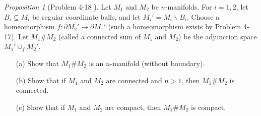 \documentclass[a4paper]{article}
\theoremstyle{remark}
\newtheorem{prop}{Proposition}
\newcommand{\doo}{\partial}    %
\newcommand{\subhim}{\subseteq} %
\begin{document}
\begin{prop}[Problem 4-18 \cite{LeeTM}]
	Let $M_1$ and $M_2$ be $n$-manifolds. For $i =1,2$, let $B_i \subhim M_i$ be regular coordinate balls, and let $M_i' = M_i \smallsetminus B_i$. Choose a homeomorphism $f : \doo M_2' \to \doo M_1'$ (such a homeomorphism exists by Problem 4-17). Let $M_1 \# M_2$ (called
	a connected sum of $M_1$ and $M_2$) be the adjunction space $M_1' \cup_f M_2'$.
	\begin{enumerate}[nolistsep]
		\item [(a)] Show that $M_1 \# M_2$ is an $n$-manifold (without boundary).
		\item [(b)] Show that if $M_1$ and $M_2$ are connected and $n > 1$, then $M_1 \# M_2$ is connected.
		\item [(c)] Show that if $M_1$ and $M_2$ are compact, then $M_1 \# M_2$ is compact.
	\end{enumerate}
\end{prop}
\end{document}
